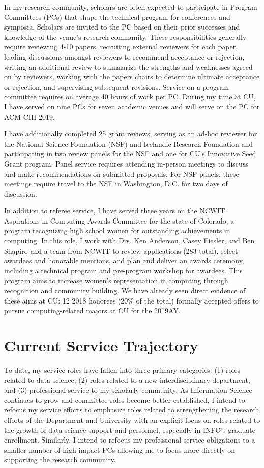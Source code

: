 \documentclass[11pt]{article}
\begin{document}
In my research community, scholars are often expected to participate in Program Committees (PCs) that shape the technical program for conferences and symposia. Scholars are invited to the PC based on their prior successes and knowledge of the venue's research community. These responsibilities generally require reviewing 4-10 papers, recruiting external reviewers for each paper, leading discussions amongst reviewers to recommend acceptance or rejection, writing an additional review to summarize the strengths and weaknesses agreed on by reviewers, working with the papers chairs to determine ultimate acceptance or rejection, and supervising subsequent revisions. Service on a program committee requires on average 40 hours of work per PC. During my time at CU, I have served on nine PCs for seven academic venues and will serve on the PC for ACM CHI 2019. 

I have additionally completed 25 grant reviews, serving as an ad-hoc reviewer for the National Science Foundation (NSF) and Icelandic Research Foundation and participating in two review panels for the NSF and one for CU's Innovative Seed Grant program. Panel service requires attending in-person meetings to discuss and make recommendations on submitted proposals. For NSF panels, these meetings require travel to the NSF in Washington, D.C. for two days of discussion. 

In addition to referee service, I have served three years on the NCWIT Aspirations in Computing Awards Committee for the state of Colorado, a program recognizing high school women for outstanding achievements in computing. In this role, I work with Drs. Ken Anderson, Casey Fiesler, and Ben Shapiro and a team from NCWIT to review applications (283 total), select awardees and honorable mentions, and plan and deliver an awards ceremony, including a technical program and pre-program workshop for awardees. This program aims to increase women's representation in computing through recognition and community building. We have already seen direct evidence of these aims at CU: 12 2018 honorees (20\% of the total) formally accepted offers to pursue computing-related majors at CU for the 2019AY.

\section*{Current Service Trajectory}
To date, my service roles have fallen into three primary categories: (1) roles related to data science, (2) roles related to a new interdisciplinary department, and (3) professional service to my scholarly community. As Information Science continues to grow and committee roles become better established, I intend to refocus my service efforts to emphasize roles related to strengthening the research efforts of the Department and University with an explicit focus on roles related to the growth of data science support and personnel, especially in INFO's graduate enrollment. Similarly, I intend to refocus my professional service obligations to a smaller number of high-impact PCs allowing me to focus more directly on supporting the research community. 

\pagebreak
\setcounter{page}{1}
\end{document}
